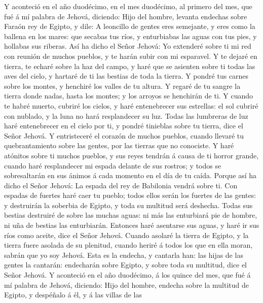  Y aconteció en el año duodécimo, en el mes duodécimo, al
primero del mes, que fué á mí palabra de Jehová, diciendo: 
Hijo del hombre, levanta endechas sobre Faraón rey de Egipto, y dile: A
leoncillo de gentes eres semejante, y eres como la ballena en los mares:
que secabas tus ríos, y enturbiabas las aguas con tus pies, y hollabas
sus riberas.  Así ha dicho el Señor Jehová: Yo extenderé
sobre ti mi red con reunión de muchos pueblos, y te harán subir con mi
esparavel.  Y te dejaré en tierra, te echaré sobre la haz
del campo, y haré que se asienten sobre ti todas las aves del cielo, y
hartaré de ti las bestias de toda la tierra.  Y pondré tus
carnes sobre los montes, y henchiré los valles de tu altura.
 Y regaré de tu sangre la tierra donde nadas, hasta los
montes; y los arroyos se henchirán de ti.  Y cuando te habré
muerto, cubriré los cielos, y haré entenebrecer sus estrellas: el sol
cubriré con nublado, y la luna no hará resplandecer su luz. 
Todas las lumbreras de luz haré entenebrecer en el cielo por ti, y
pondré tinieblas sobre tu tierra, dice el Señor Jehová.  Y
entristeceré el corazón de muchos pueblos, cuando llevaré tu
quebrantamiento sobre las gentes, por las tierras que no conociste.
 Y haré atónitos sobre ti muchos pueblos, y sus reyes
tendrán á causa de ti horror grande, cuando haré resplandecer mi espada
delante de sus rostros; y todos se sobresaltarán en sus ánimos á cada
momento en el día de tu caída.  Porque así ha dicho el
Señor Jehová: La espada del rey de Babilonia vendrá sobre ti.
 Con espadas de fuertes haré caer tu pueblo; todos ellos
serán los fuertes de las gentes: y destruirán la soberbia de Egipto, y
toda su multitud será deshecha.  Todas sus bestias
destruiré de sobre las muchas aguas: ni más las enturbiará pie de
hombre, ni uña de bestias las enturbiarán.  Entonces haré
asentarse sus aguas, y haré ir sus ríos como aceite, dice el Señor
Jehová.  Cuando asolaré la tierra de Egipto, y la tierra
fuere asolada de su plenitud, cuando heriré á todos los que en ella
moran, sabrán que yo soy Jehová.  Esta es la endecha, y
cantarla han: las hijas de las gentes la cantarán: endecharán sobre
Egipto, y sobre toda su multitud, dice el Señor Jehová.  Y
aconteció en el año duodécimo, á los quince del mes, que fué á mí
palabra de Jehová, diciendo:  Hijo del hombre, endecha
sobre la multitud de Egipto, y despéñalo á él, y á las villas de las
